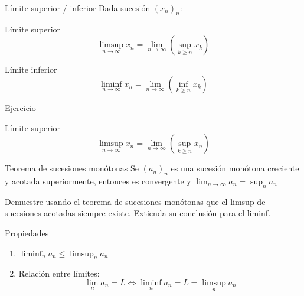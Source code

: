 \documentclass[14pt,aspectratio=169,xcolor=dvipsnames]{beamer}
\begin{document}
\begin{frame}{Límite superior / inferior}
    Dada sucesión $(x_n)_n$:
    \begin{block}{Límite superior}
        $$\limsup_{n\to\infty}x_n = \lim_{n\to\infty}\left(\sup_{k\geq n}x_k\right) $$
    \end{block}

    \begin{block}{Límite inferior}
        $$\liminf_{n\to\infty}x_n = \lim_{n\to\infty}\left(\inf_{k\geq n}x_k\right)$$
    \end{block}
\end{frame}
\begin{frame}[t]{Ejercicio}
    \begin{block}{Límite superior}
        $$\limsup_{n\to\infty}x_n = \lim_{n\to\infty}\left(\sup_{k\geq n}x_n\right) $$
    \end{block}
    \begin{block}{Teorema de sucesiones monótonas}
        Se $(a_n)_n$ es una sucesión monótona creciente y acotada superiormente, entonces es convergente y $ \lim_{n \to \infty}a_n = \sup_n a_n $
    \end{block}
    Demuestre usando el teorema de sucesiones monótonas que el limsup de sucesiones acotadas siempre existe. Extienda su conclusión para el liminf. 
\end{frame}
\begin{frame}{Propiedades}
    \begin{enumerate}
        \item $\liminf_n a_n \leq \limsup_n a_n$
        \item Relación entre límites: 
            $$ \lim_n a_n = L \Leftrightarrow \liminf_n a_n = L = \limsup_n a_n $$
    \end{enumerate}
\end{frame}
\begin{frame}
    \maketitle
\end{frame}
\end{document}
